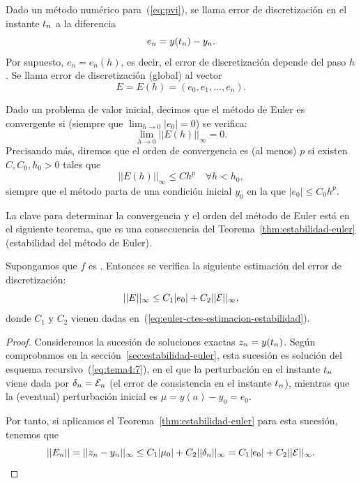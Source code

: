 \begin{definition}
  \label{def:error-discretizacion-pvi}
  Dado un método numérico para~(\ref{eq:pvi}), se llama error de
  discretización en el instante ${t_n}$ a la diferencia
  \begin{equation*}
    e_n = y({t_n})-{y_n}.
  \end{equation*}
  Por supuesto, $e_n=e_n(h)$, es decir, el error de discretización
  depende del paso $h$. Se llama error de discretización (global) al
  vector
  \begin{equation*}
    E = E(h) = (e_0,e_1,...,e_n).
  \end{equation*}
\end{definition}
\begin{definition}
  \label{def:convergencia-euler}
  Dado un problema de valor inicial, decimos que el método de Euler es
  convergente si (siempre que $\lim_{h\to 0} |e_0|=0$) se verifica:
  \begin{equation*}
    \lim_{h\to 0} ||E(h)||_\infty = 0.
  \end{equation*}
  Precisando más, diremos que el orden de convergencia es (al menos)
  $p$ si existen $C, C_0, h_0>0$ tales que
  \begin{equation*}
    ||E(h)||_\infty \le C h^p \quad \forall h<h_0,
  \end{equation*}
  siempre que el método parta de una condición inicial $y_0$ en la que
  $|e_0|\le C_0 h^p$.
\end{definition}

La clave para determinar la convergencia y el orden del método de
Euler está en el siguiente teorema, que es una consecuencia del
Teorema~\ref{thm:estabilidad-euler} (estabilidad del método de Euler).
\begin{theorem}
  \label{thm:euler:estimacion-error-discretizacion}
  Supongamos que $f$ es \globLipschitz. Entonces se verifica la
  siguiente estimación del error de discretización:
  \begin{equation}
    \label{eq:estimacion-discretizacion}
    ||E||_\infty \le C_1 |e_0| + C_2 ||{\cal E}||_\infty,
  \end{equation}
  donde $C_1$ y $C_2$ vienen dadas
  en~(\ref{eq:euler-ctes-estimacion-estabilidad}).
\end{theorem}
\begin{proof}
  Consideremos la sucesión de soluciones exactas $z_n=y({t_n})$. Según
  comprobamos en la sección~\ref{sec:estabilidad-euler}, esta sucesión
  es solución del esquema recursivo~(\ref{eq:tema4:7}), en el que la
  perturbación en el instante ${t_n}$ viene dada por
  $\delta_n={\cal E}_n$ (el error de consistencia en el instante
  ${t_n}$), mientras que la (eventual) perturbación inicial es
  $\mu=y(a)-y_0=e_0$.

  Por tanto, si aplicamos el Teorema~\ref{thm:estabilidad-euler} para
  esta sucesión, tenemos que
  $$
  ||E_n|| = ||{z_n} - {y_n}||_\infty \le C_1|\mu_0| + C_2
  ||\delta_n||_\infty  = C_1|e_0| + C_2 ||{\cal E}||_\infty.
  $$
\end{proof}

